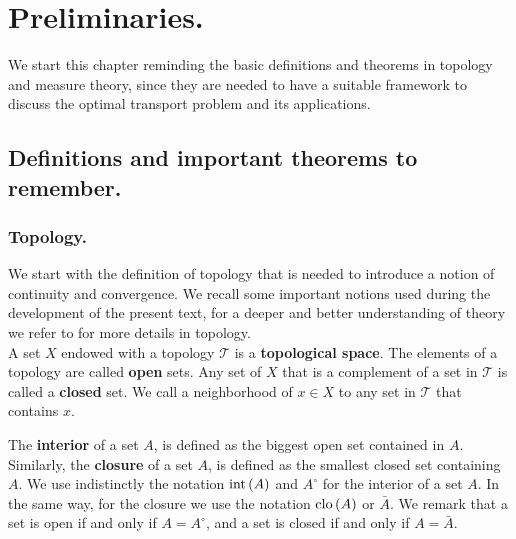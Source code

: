 \chapter{Preliminaries.}
We start this chapter reminding the basic definitions and theorems in topology and measure theory, since they are needed to have a suitable framework to discuss the optimal transport problem and its applications.

 
\section{Definitions and important theorems to remember.}

\subsection{Topology.}
We start with the definition of topology that is needed to introduce a notion of continuity and convergence. We recall some important notions used during the development of the present text, for a deeper and better understanding of theory we refer to \cite{munkres2000topology} for more details in topology. 
\\

A set $X$ endowed with a topology $\mathcal{T}$ is a \textbf{topological space}. The elements of a topology are called \textbf{open} sets. Any set of $X$ that is a complement of a set in $\mathcal T$ is called a \textbf{closed} set. We call a neighborhood of $x\in X$ to any set in $\mathcal{T}$ that contains $x$.

The \textbf{interior} of a set $A$, is defined as the biggest open set contained in $A$. Similarly, the \textbf{closure} of a set $A$, is defined as the smallest closed set containing $A$. We use indistinctly the notation $\mathrm{int}\,(A)$ and $A^{\circ}$ for the interior of a set $A$. In the same way, for the closure we use the notation $\mathrm{clo}\,(A)$ or $\bar{A}$. We remark that a set is open if and only if $A=A^{\circ}$, and a set is closed if and only if $A=\bar{A}$.
\\

